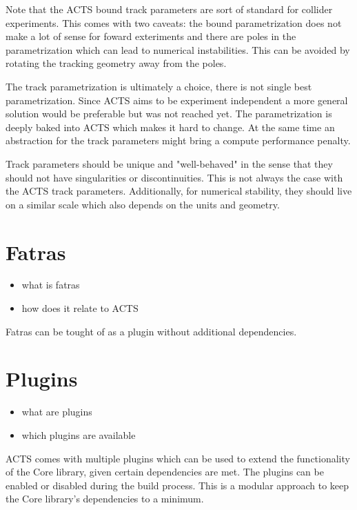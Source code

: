 Note that the ACTS bound track parameters are sort of standard for collider experiments. This comes with two caveats: the bound parametrization does not make a lot of sense for foward exteriments and there are poles in the parametrization which can lead to numerical instabilities. This can be avoided by rotating the tracking geometry away from the poles.

The track parametrization is ultimately a choice, there is not single best parametrization. Since ACTS aims to be experiment independent a more general solution would be preferable but was not reached yet. The parametrization is deeply baked into ACTS which makes it hard to change. At the same time an abstraction for the track parameters might bring a compute performance penalty.

Track parameters should be unique and "well-behaved" in the sense that they should not have singularities or discontinuities. This is not always the case with the ACTS track parameters. Additionally, for numerical stability, they should live on a similar scale which also depends on the units and geometry.

\section{Fatras}

\begin{itemize}
    \color{red}
    \item what is fatras
    \item how does it relate to ACTS
\end{itemize}

Fatras can be tought of as a plugin without additional dependencies.

\section{Plugins}

\begin{itemize}
    \color{red}
    \item what are plugins
    \item which plugins are available
\end{itemize}

ACTS comes with multiple plugins which can be used to extend the functionality of the Core library, given certain dependencies are met. The plugins can be enabled or disabled during the build process. This is a modular approach to keep the Core library's dependencies to a minimum.

